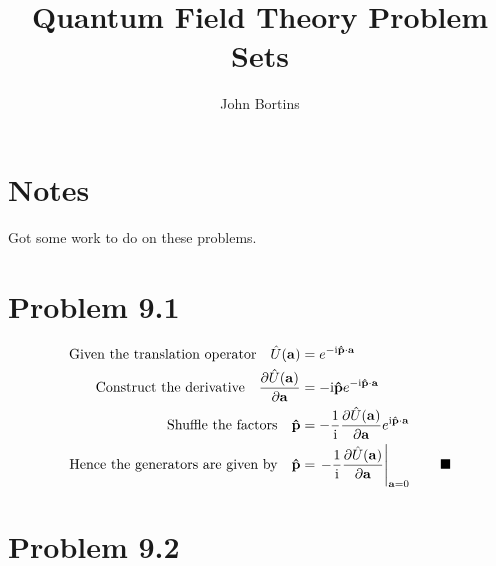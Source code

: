 \documentclass{article}
\title{Quantum Field Theory Problem Sets}
\author{John Bortins}
\begin{document}
\maketitle{}

\section*{Notes}

Got some work to do on these problems.

\section*{Problem 9.1}

\begin{align*}
	\qq*{Given the translation operator}\hat{U}(\vb{a})         & =e^{-\text{i}\vb{\hat{p}}\cdot\vb{a}}                                                 \\
	\qq*{Construct the derivative}\pdv{\hat{U}(\vb{a})}{\vb{a}} & =-\text{i}\vb{\hat{p}}e^{-\text{i}\vb{\hat{p}}\cdot\vb{a}}                            \\
	\qq*{Shuffle the factors}\vb{\hat{p}}                       & =-\frac{1}{\text{i}}\pdv{\hat{U}(\vb{a})}{\vb{a}}e^{\text{i}\vb{\hat{p}}\cdot\vb{a}}  \\
	\qq*{Hence the generators are given by}\vb{\hat{p}}         & =\eval{-\frac{1}{\text{i}}\pdv{\hat{U}(\vb{a})}{\vb{a}}}_{\vb{a}=0}\qquad\blacksquare
\end{align*}



\section*{Problem 9.2}
\end{document}

